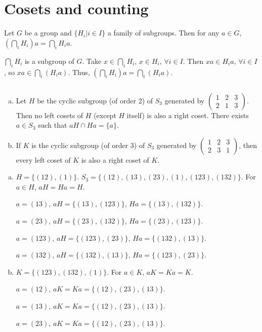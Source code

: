 \section{Cosets and counting}
\begin{ex}
    Let $G$ be a group and $\{H_{i}|i\in I\}$ a family of subgroups. Then for any $a\in G$, $(\bigcap\limits_{i}H_{i})a=\bigcap\limits_{i}H_{i}a$.
\end{ex}

\begin{answer}
    $\bigcap\limits_{i}H_{i}$ is a subgroup of $G$. Take $x\in \bigcap\limits_{i}H_{i}$, $x\in H_{i}$, $\forall i\in I$. Then $xa\in H_{i}a$, $\forall i\in I$, so $xa\in \bigcap\limits_{i}(H_{i}a)$. Thus, $(\bigcap\limits_{i}H_{i})a=\bigcap\limits_{i}(H_{i}a)$.
\end{answer}

$$ $$

\begin{ex}
    \begin{enumerate}[(a)]
        \item Let $H$ be the cyclic subgroup (of order 2) of $S_{3}$ generated by $\begin{pmatrix}
            1 & 2 &3\\2& 1&3
        \end{pmatrix}$. Then no left cosets of $H$ (except $H$ itself) is also a right coset. There exists $a\in S_{3}$ such that $aH\cap Ha=\{a\}$.
        \item If $K$ is the cyclic subgroup (of order 3) of $S_{3}$ generated by $\begin{pmatrix}
            1 & 2&3\\2& 3 &1
        \end{pmatrix}$, then every left coset of $K$ is also a right coset of $K$.
    \end{enumerate}
\end{ex}

\begin{answer}
    \begin{enumerate}[(a)]
        \item $H=\{(12),(1)\}$. $S_{3}=\{(12),(13),(23),(1),(123),(132)\}$. For $a\in H$, $aH=Ha=H$.
        
        $a=(13)$, $aH=\{(13),(123)\}$, $Ha=\{(13),(132)\}$.

        $a=(23)$, $aH=\{(23),(132)\}$, $Ha=\{(23),(123)\}$.

        $a=(123)$, $aH=\{(123),(23)\}$, $Ha=\{(132),(13)\}$.

        $a=(132)$, $aH=\{(132),(13)\}$, $Ha=\{(123),(23)\}$.
        
        \item $K=\{(123),(132),(1)\}$. For $a\in K$, $aK=Ka=K$.
        
        $a=(12)$, $aK=Ka=\{(12),(23),(13)\}$.
        
        $a=(13)$, $aK=Ka=\{(12),(23),(13)\}$.

        $a=(23)$, $aK=Ka=\{(12),(23),(13)\}$.
    \end{enumerate}
\end{answer}

